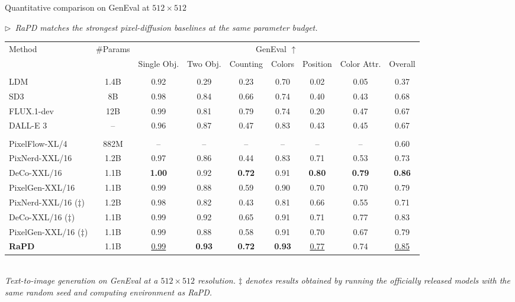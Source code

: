 \documentclass[aspectratio=169,10pt]{beamer}
\newcommand{\story}[1]{%
  {\color{rapdgray}\itshape\footnotesize $\triangleright$~#1\par}\vspace{0.3em}}
\begin{document}
\begin{frame}{Quantitative comparison on \alert{GenEval} at $512\!\times\!512$}
  \story{RaPD matches the strongest pixel-diffusion baselines at the same parameter budget.}
  \begin{center}
  \scriptsize
  \setlength{\tabcolsep}{3pt}
  \begin{tabular}{l|c|ccccccc}
    \toprule
    \multirow{2}{*}{Method} & \multirow{2}{*}{\#Params} & \multicolumn{7}{c}{GenEval $\uparrow$} \\
     &  & Single Obj. & Two Obj. & Counting & Colors & Position & Color Attr. & Overall \\
    \midrule
    \rowcolor{gray!15}
    \multicolumn{9}{c}{$\triangledown$ \textit{Latent Diffusion Models}} \\
    LDM             & 1.4B & 0.92 & 0.29 & 0.23 & 0.70 & 0.02 & 0.05 & 0.37 \\
    SD3             & 8B   & 0.98 & 0.84 & 0.66 & 0.74 & 0.40 & 0.43 & 0.68 \\
    FLUX.1-dev      & 12B  & 0.99 & 0.81 & 0.79 & 0.74 & 0.20 & 0.47 & 0.67 \\
    DALL-E 3        & --   & 0.96 & 0.87 & 0.47 & 0.83 & 0.43 & 0.45 & 0.67 \\
    \midrule
    \rowcolor{gray!15}
    \multicolumn{9}{c}{$\triangledown$ \textit{Pixel Diffusion Models}} \\
    PixelFlow-XL/4  & 882M & --   & --   & --   & --   & --   & --   & 0.60 \\
    PixNerd-XXL/16  & 1.2B & 0.97 & 0.86 & 0.44 & 0.83 & 0.71 & 0.53 & 0.73 \\
    DeCo-XXL/16     & 1.1B & \textbf{1.00} & 0.92 & \textbf{0.72} & 0.91 & \textbf{0.80} & \textbf{0.79} & \textbf{0.86} \\
    PixelGen-XXL/16 & 1.1B & 0.99 & 0.88 & 0.59 & 0.90 & 0.70 & 0.70 & 0.79 \\
    PixNerd-XXL/16 ($\ddagger$)  & 1.2B & 0.98 & 0.82 & 0.43 & 0.81 & 0.66 & 0.55 & 0.71 \\
    DeCo-XXL/16 ($\ddagger$)     & 1.1B & 0.99 & 0.92 & 0.65 & 0.91 & 0.71 & 0.77 & 0.83 \\
    PixelGen-XXL/16 ($\ddagger$) & 1.1B & 0.99 & 0.88 & 0.58 & 0.91 & 0.70 & 0.67 & 0.79 \\
    \midrule
    \rowcolor{lightbluepurple}
    \textbf{RaPD}   & 1.1B & \underline{0.99} & \textbf{0.93} & \textbf{0.72} & \textbf{0.93} & \underline{0.77} & 0.74 & \underline{0.85} \\
    \bottomrule
  \end{tabular}\\[0.4em]
  {\scriptsize\itshape\color{rapdgray}Text-to-image generation on GenEval at a $512\!\times\!512$ resolution. $\ddagger$ denotes results obtained by running the officially released models with the same random seed and computing environment as RaPD.}
  \end{center}
\end{frame}
\end{document}
